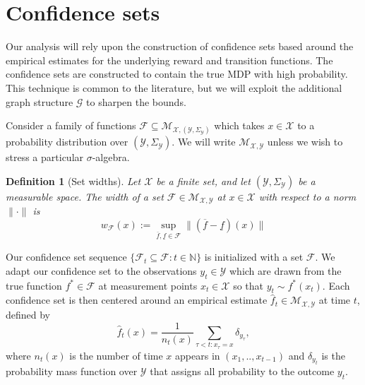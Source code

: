 \documentclass{article}
\newtheorem{mydef}{Definition}
\newcommand{\Nat}{\mathbb{N}}
\newcommand{\Xc}{\mathcal{X}}
\newcommand{\Yc}{\mathcal{Y}}
\newcommand{\Fc}{\mathcal{F}}
\newcommand{\Gc}{\mathcal{G}}
\newcommand{\Mc}{\mathcal{M}}
\begin{document}
\section{Confidence sets}
Our analysis will rely upon the construction of confidence sets based around the empirical estimates for the underlying reward and transition functions.
The confidence sets are constructed to contain the true MDP with high probability.
This technique is common to the literature, but we will exploit the additional graph structure $\Gc$ to sharpen the bounds.

Consider a family of functions $\Fc \subseteq \Mc_{\Xc,(\Yc,\Sigma_\Yc)}$ which takes $x \in \Xc$ to a probability distribution over $(\Yc, \Sigma_\Yc)$.
We will write $\Mc_{\Xc,\Yc}$ unless we wish to stress a particular $\sigma$-algebra.
\begin{mydef}[Set widths] \hspace{0.000000001mm} \newline
Let $\Xc$ be a finite set, and let $(\Yc,\Sigma_{\Yc})$ be a measurable space.  The {\it width} of a set $\Fc \in \Mc_{\Xc,\Yc}$ at $x \in \Xc$ with respect to 
a norm $\|\cdot\|$ is
$$w_{\mathcal{F}}(x) := \sup_{\overline{f}, \underline{f} \in \mathcal{F}} \|(\overline{f} -  \underline{f})(x)\|$$
\end{mydef}

Our confidence set sequence $\{\Fc_t \subseteq \Fc : t \in \Nat\}$ is initialized with a set $\Fc$.
We adapt our confidence set to the observations $y_t \in \Yc$ which are drawn from the true function $f^* \in \Fc$ at measurement points $x_t \in \Xc$ so that $y_t \sim f^*(x_t)$.
Each confidence set is then centered around an empirical estimate $\hat{f}_t \in \Mc_{\Xc,\Yc}$ at time $t$, defined by
$$\hat{f}_t(x) = \frac{1}{n_t(x)} \sum_{\tau < t: x_\tau = x} \delta_{y_\tau},$$
where $n_t(x)$ is the number of time $x$ appears in $(x_1, .. ,x_{t-1})$ and $\delta_{y_t}$ is the probability mass function over $\Yc$ that assigns all probability to the outcome $y_t$.
\end{document}
